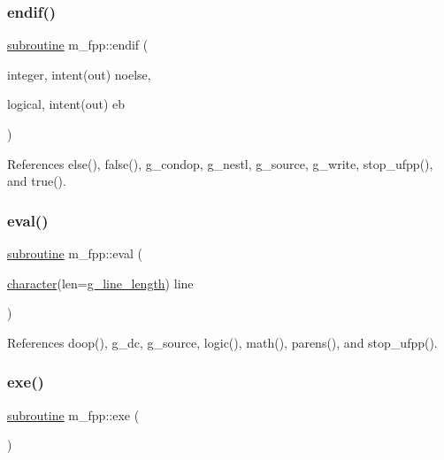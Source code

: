 \mbox{\label{namespacem__fpp_a943f646c7373dc0d88d4e6fe905fd90f}} 
\subsubsection{\texorpdfstring{endif()}{endif()}}
{\footnotesize\ttfamily \hyperlink{M__stopwatch_83_8txt_acfbcff50169d691ff02d4a123ed70482}{subroutine} m\+\_\+fpp\+::endif (\begin{DoxyParamCaption}\item[{integer, intent(out)}]{noelse,  }\item[{logical, intent(out)}]{eb }\end{DoxyParamCaption})}



References else(), false(), g\+\_\+condop, g\+\_\+nestl, g\+\_\+source, g\+\_\+write, stop\+\_\+ufpp(), and true().

\mbox{\label{namespacem__fpp_a7f223128c476778fa0334675c1431371}} 
\subsubsection{\texorpdfstring{eval()}{eval()}}
{\footnotesize\ttfamily \hyperlink{M__stopwatch_83_8txt_acfbcff50169d691ff02d4a123ed70482}{subroutine} m\+\_\+fpp\+::eval (\begin{DoxyParamCaption}\item[{\hyperlink{option__stopwatch_83_8txt_abd4b21fbbd175834027b5224bfe97e66}{character}(len=\hyperlink{namespacem__fpp_ab93f8756cf248cf8db932573009d4664}{g\+\_\+line\+\_\+length})}]{line }\end{DoxyParamCaption})}



References doop(), g\+\_\+dc, g\+\_\+source, logic(), math(), parens(), and stop\+\_\+ufpp().

\mbox{\label{namespacem__fpp_a1149aa9cc5620d40fa315e4de3937776}} 
\subsubsection{\texorpdfstring{exe()}{exe()}}
{\footnotesize\ttfamily \hyperlink{M__stopwatch_83_8txt_acfbcff50169d691ff02d4a123ed70482}{subroutine} m\+\_\+fpp\+::exe (\begin{DoxyParamCaption}{ }\end{DoxyParamCaption})}




